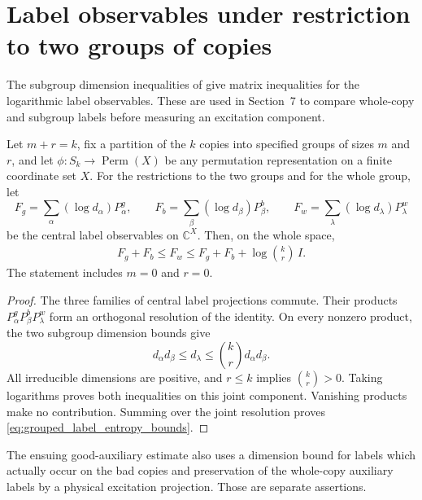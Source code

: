 \section{Label observables under restriction to two groups of copies}
\label{sec:grouped_label_entropy}

The subgroup dimension inequalities of \cite[Lemma~6.1(4)]{OpenAI2026AreaLaw}
give matrix inequalities for the logarithmic label observables. These are
used in Section~7 to compare whole-copy and subgroup labels before measuring
an excitation component.

\begin{theorem}
\label{thm:grouped_label_entropy_bounds}
\leanok
Let $m+r=k$, fix a partition of the $k$ copies into specified groups of
sizes $m$ and $r$, and let $\phi:S_k\to\operatorname{Perm}(X)$ be any
permutation representation on a finite coordinate set $X$. For the
restrictions to the two groups and for the whole group, let
\[
 F_g=\sum_\alpha(\log d_\alpha)P^g_\alpha,\qquad
 F_b=\sum_\beta(\log d_\beta)P^b_\beta,\qquad
 F_w=\sum_\lambda(\log d_\lambda)P^w_\lambda
\]
be the central label observables on $\mathbb C^X$. Then, on the whole space,
\begin{align}
 F_g+F_b\le F_w\le F_g+F_b+\log\binom{k}{r}\,I.
 \label{eq:grouped_label_entropy_bounds}
\end{align}
The statement includes $m=0$ and $r=0$.
\end{theorem}
\begin{proof}
\leanok
The three families of central label projections commute. Their products
$P^g_\alpha P^b_\beta P^w_\lambda$ form an orthogonal resolution of the
identity. On every nonzero product, the two subgroup dimension bounds give
\[
 d_\alpha d_\beta\le d_\lambda
 \le\binom{k}{r}d_\alpha d_\beta.
\]
All irreducible dimensions are positive, and $r\le k$ implies
$\binom{k}{r}>0$. Taking logarithms proves both inequalities on this
joint component. Vanishing products make no contribution. Summing over the
joint resolution proves \eqref{eq:grouped_label_entropy_bounds}.
\end{proof}

The ensuing good-auxiliary estimate also uses a dimension bound for labels
which actually occur on the bad copies and preservation of the whole-copy
auxiliary labels by a physical excitation projection. Those are separate
assertions.
